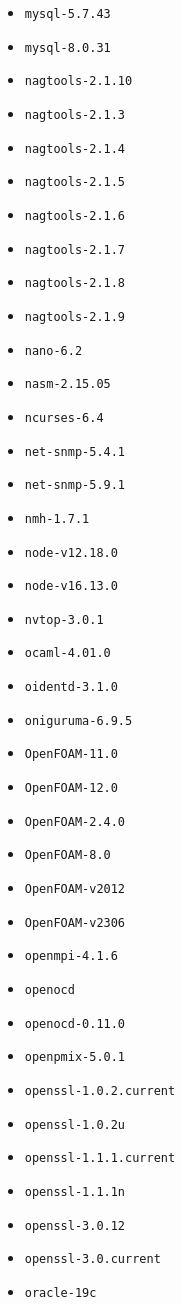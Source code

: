 \begin{multicols}{3}
\begin{itemize}
\item \verb|mysql-5.7.43|
\item \verb|mysql-8.0.31|
\item \verb|nagtools-2.1.10|
\item \verb|nagtools-2.1.3|
\item \verb|nagtools-2.1.4|
\item \verb|nagtools-2.1.5|
\item \verb|nagtools-2.1.6|
\item \verb|nagtools-2.1.7|
\item \verb|nagtools-2.1.8|
\item \verb|nagtools-2.1.9|
\item \verb|nano-6.2|
\item \verb|nasm-2.15.05|
\item \verb|ncurses-6.4|
\item \verb|net-snmp-5.4.1|
\item \verb|net-snmp-5.9.1|
\item \verb|nmh-1.7.1|
\item \verb|node-v12.18.0|
\item \verb|node-v16.13.0|
\item \verb|nvtop-3.0.1|
\item \verb|ocaml-4.01.0|
\item \verb|oidentd-3.1.0|
\item \verb|oniguruma-6.9.5|
\item \verb|OpenFOAM-11.0|
\item \verb|OpenFOAM-12.0|
\item \verb|OpenFOAM-2.4.0|
\item \verb|OpenFOAM-8.0|
\item \verb|OpenFOAM-v2012|
\item \verb|OpenFOAM-v2306|
\item \verb|openmpi-4.1.6|
\item \verb|openocd|
\item \verb|openocd-0.11.0|
\item \verb|openpmix-5.0.1|
\item \verb|openssl-1.0.2.current|
\item \verb|openssl-1.0.2u|
\item \verb|openssl-1.1.1.current|
\item \verb|openssl-1.1.1n|
\item \verb|openssl-3.0.12|
\item \verb|openssl-3.0.current|
\item \verb|oracle-19c|

\end{itemize}
\end{multicols}
